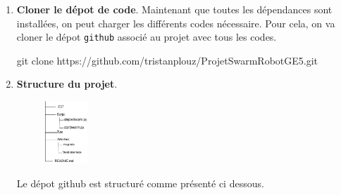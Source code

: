 \documentclass[a4paper, 10pt]{article}
\begin{document}
\begin{enumerate}

	\item\textbf{Cloner le dépot de code}.
	Maintenant que toutes les dépendances sont installées, on peut charger les différents codes nécessaire.
	Pour cela, on va cloner le dépot \texttt{github} associé au projet avec tous les codes.
\begin{commandshell}
git clone https://github.com/tristanplouz/ProjetSwarmRobotGE5.git
\end{commandshell}
	\item\textbf{Structure du projet}.
		\begin{figure}[h]
		\centering
			\includegraphics[width=0.15\textwidth]{fig/arbor}
		\end{figure}
		Le dépot github est structuré comme présenté ci dessous. \\
		

\end{enumerate}
\end{document}
